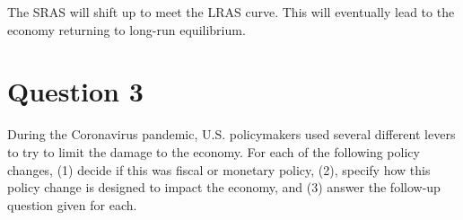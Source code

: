 \documentclass{article}
\newcommand{\question}[1]{\pagebreak\section{Question #1}}
\begin{document}
\begin{enumerate}[(a)]

    The SRAS will shift up to meet the LRAS curve. This will eventually lead to the economy returning to long-run equilibrium.

\end{enumerate}

\pagebreak

\question{3}
During the Coronavirus pandemic, U.S. policymakers used several different levers to try to limit the damage to the economy. For each of
the following policy changes, (1) decide if this was fiscal or monetary
policy, (2), specify how this policy change is designed to impact the
economy, and (3) answer the follow-up question given for each.
\end{document}
